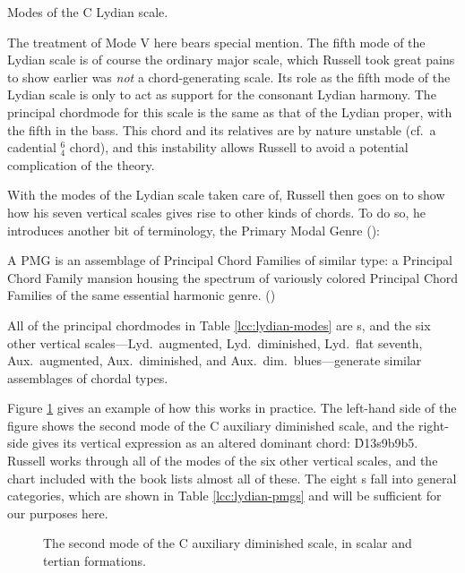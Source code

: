 \begin{table}[tbp]
  \caption{Modes of the C Lydian scale.}
  \label{lcc:lydian-modes}
\end{table}

The treatment of Mode V here bears special mention. The fifth mode of the
Lydian scale is of course the ordinary major scale, which Russell took great
pains to show earlier was \emph{not} a chord-generating scale. Its
role as the fifth mode of the Lydian scale is only to act as support for the
consonant Lydian harmony. The principal chordmode for this scale is the same
as that of the Lydian proper, with the fifth in the bass. This chord and its
relatives are by nature unstable (cf.\ a cadential $^6_4$ chord), and this
instability allows Russell to avoid a potential complication of the theory.

With the modes of the Lydian scale taken care of, Russell then goes on to show
how his seven vertical scales gives rise to other kinds of chords. To do so,
he introduces another bit of terminology, the Primary Modal Genre
():%
%
\begin{quoting}
  \singlespacing
  A PMG is an assemblage of Principal Chord Families of similar type: a
  Principal Chord Family mansion housing the spectrum of variously colored
  Principal Chord Families of the same essential harmonic
  genre. ()
\end{quoting}
%
\noindent All of the principal chordmodes in Table \ref{lcc:lydian-modes} are
s, and the six other vertical scales---Lyd.\ augmented, Lyd.\
diminished, Lyd.\ flat seventh, Aux.\ augmented, Aux.\ diminished, and Aux.\
dim.\ blues---generate similar assemblages of chordal types.

Figure \ref{lcc:alternate-pmg} gives an example of how this works in practice.
The left-hand side of the figure shows the second mode of the C auxiliary
diminished scale, and the right-side gives its vertical expression as an
altered dominant chord: \h{D13s9b9b5}. Russell works through all of the modes
of the six other vertical scales, and the chart included with the book lists
almost all of these. The eight \abbrev{PMG}s fall into general categories,
which are shown in Table \ref{lcc:lydian-pmgs} and will be sufficient for our
purposes here.\fn{lcc-20}

\begin{figure}[tb]
  \caption{The second mode of the C auxiliary diminished scale, in scalar and
    tertian formations.}
  \label{lcc:alternate-pmg}
\end{figure}

